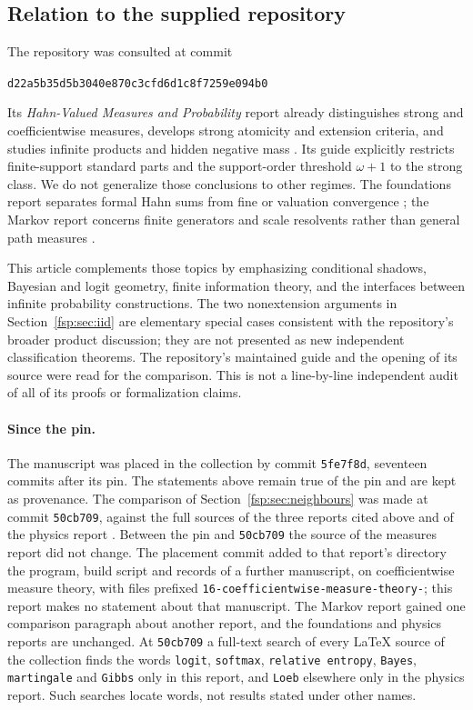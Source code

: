 \documentclass[11pt,a4paper]{article}
\numberwithin{equation}{section}
\theoremstyle{definition}
\theoremstyle{remark}
\newcommand{\pin}{\texttt{d22a5b35d5b3040e870c3cfd6d1c8f7259e094b0}}
\begin{document}
\subsection{Relation to the supplied repository}\label{fsp:sub:repository}

The repository was consulted at commit
\begin{center}\small\pin\end{center}
Its \emph{Hahn-Valued Measures and Probability} report already distinguishes
strong and coefficientwise measures, develops strong atomicity and extension
criteria, and studies infinite products and hidden negative mass
\cite{repomeasures}. Its guide explicitly restricts finite-support standard
parts and the support-order threshold $\omega+1$ to the strong class. We do
not generalize those conclusions to other regimes. The foundations report
separates formal Hahn sums from fine or valuation convergence
\cite{repofound}; the Markov report concerns finite generators and scale
resolvents rather than general path measures \cite{repomarkov}.

This article complements those topics by emphasizing conditional shadows,
Bayesian and logit geometry, finite information theory, and the interfaces
between infinite probability constructions. The two nonextension arguments
in Section~\ref{fsp:sec:iid} are elementary special cases consistent with the
repository's broader product discussion; they are not presented as new
independent classification theorems. The repository's maintained guide and
the opening of its source were read for the comparison. This is not a
line-by-line independent audit of all of its proofs or formalization claims.

\paragraph{Since the pin.}
The manuscript was placed in the collection by commit \texttt{5fe7f8d},
seventeen commits after its pin. The statements above remain true of the pin
and are kept as provenance. The comparison of
Section~\ref{fsp:sec:neighbours} was made at commit \texttt{50cb709}, against
the full sources of the three reports cited above and of the physics report
\cite{repophys}. Between the pin and \texttt{50cb709} the source of the
measures report did not change. The placement commit added to that report's
directory the program, build script and records of a further manuscript, on
coefficientwise measure theory, with files prefixed
\texttt{16-coefficientwise-measure-theory-}; this report makes no statement
about that manuscript. The Markov report gained one comparison paragraph about
another report, and the foundations and physics reports are unchanged. At
\texttt{50cb709} a full-text search of every LaTeX source of the collection
finds the words \texttt{logit}, \texttt{softmax}, \texttt{relative entropy},
\texttt{Bayes}, \texttt{martingale} and \texttt{Gibbs} only in this report,
and \texttt{Loeb} elsewhere only in the physics report. Such searches locate
words, not results stated under other names.
\end{document}
